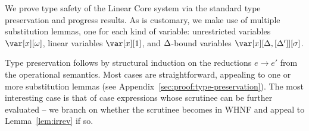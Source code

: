 \documentclass[acmsmall,review,anonymous,screen]{acmart}
\begin{document}


We prove type safety of the Linear Core system via the standard type
preservation and progress results. As is customary, we make use of multiple
substitution lemmas, one for each kind of variable: unrestricted variables
$\xo$, linear variables $\xl$, and $\Delta$-bound variables $\xD$.


\TypePreservationTheorem
%
\ProgressTheorem
%
Type preservation
follows by structural induction on the reductions $e \longrightarrow
e'$ from the operational semantics. Most cases are straightforward, appealing to one or more
substitution lemmas (see Appendix~\ref{sec:proof:type-preservation}). The most
interesting case is that of case expressions whose scrutinee can be further
evaluated -- we branch on whether the scrutinee becomes in WHNF and appeal to Lemma~\ref{lem:irrev} if so.
%
%
%
%
\end{document}
